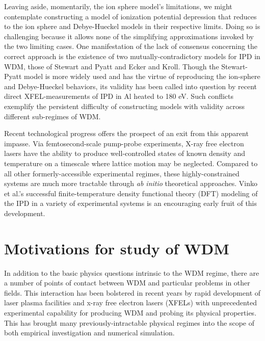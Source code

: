\documentclass [11pt, proquest, article] {uwthesis}[2016/11/22]
\begin{document}

Leaving aside, momentarily, the ion sphere model's limitations, we might contemplate constructing a model of ionization potential depression that reduces to the ion sphere and Debye-Hueckel models in their respective limits. Doing so is challenging because it allows none of the simplifying approximations invoked by the two limiting cases. One manifestation of the lack of consensus concerning the correct approach is the existence of two mutually-contradictory models for IPD in WDM, those of Stewart and Pyatt \cite{stewart1966lowering} and Ecker and Kroll. \cite{ecker1963lowering} Though the Stewart-Pyatt model is more widely used and has the virtue of reproducing the ion-sphere and Debye-Hueckel behaviors, its validity has been called into question by recent direct XFEL-measurements of IPD in Al heated to 180 eV. \cite{ciricosta2012direct, crowley2014continuum} Such conflicts exemplify the persistent difficulty of constructing models with validity across different sub-regimes of WDM.

Recent technological progress offers the prospect of an exit from this apparent impasse. Via femtosecond-scale pump-probe experiments, X-ray free electron lasers have the ability to produce well-controlled states of known density and temperature on a timescale where lattice motion may be neglected. Compared to all other formerly-accessible experimental regimes, these highly-constrained systems are much more tractable through \emph{ab initio} theoretical approaches. Vinko et al.'s successful finite-temperature density functional theory (DFT) modeling of the IPD in a variety of experimental systems is an encouraging early fruit of this development. \cite{vinko2014density}


\section{Motivations for study of WDM}
In addition to the basic physics questions intrinsic to the WDM regime, there are a number of points of contact between WDM and particular problems in other fields. This interaction has been bolstered in recent years by rapid development of laser plasma facilities and x-ray free electron lasers (XFELs) with unprecedented experimental capability for producing WDM and probing its physical properties. This has brought many previously-intractable physical regimes into the scope of both empirical investigation and numerical simulation.  
\end{document}

